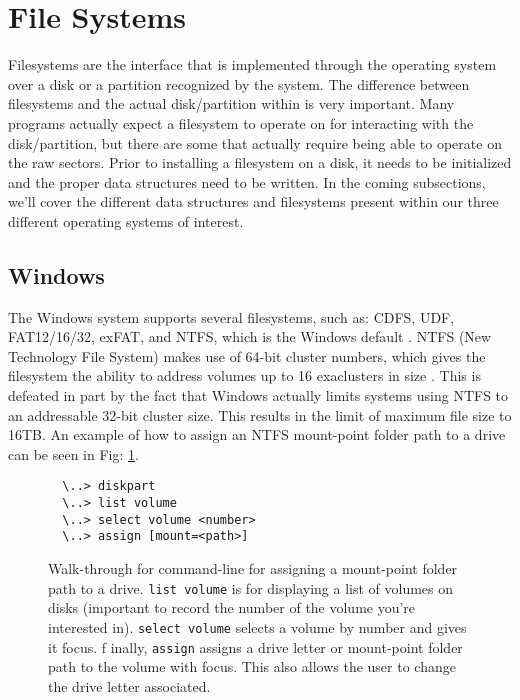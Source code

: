 \documentclass[10pt,draftclsnofoot,onecolumn]{IEEEtran}
\begin{document}
\section{File Systems}
\label{sec:File Systems}

\par Filesystems are the interface that is implemented through the operating system over a disk or a partition recognized by the system.
The difference between filesystems and the actual disk/partition within is very important.
Many programs actually expect a filesystem to operate on for interacting with the disk/partition, but there are some that actually require being able to operate on the raw sectors.
Prior to installing a filesystem on a disk, it needs to be initialized and the proper data structures need to be written.
In the coming subsections, we'll cover the different data structures and filesystems present within our three different operating systems of interest.

\subsection{Windows}
\label{sub:File Systems Windows}

\par The Windows system supports several filesystems, such as: CDFS, UDF, FAT12/16/32, exFAT, and NTFS, which is the Windows default \cite{win:2}.
NTFS (New Technology File System) makes use of 64-bit cluster numbers, which gives the filesystem the ability to address volumes up to 16 exaclusters in size \cite{win:2}.
This is defeated in part by the fact that Windows actually limits systems using NTFS to an addressable 32-bit cluster size.
This results in the limit of maximum file size to 16TB.
An example of how to assign an NTFS mount-point folder path to a drive can be seen in Fig: \ref{code:ntfs-mount}.

\begin{figure}[h]
\begin{lstlisting}
  \..> diskpart
  \..> list volume
  \..> select volume <number>
  \..> assign [mount=<path>]
\end{lstlisting}
\centering
\captionsetup{justification=centering}
\caption{
  Walk-through for command-line for assigning a mount-point folder path to a drive.
  \texttt{list volume} is for displaying a list of volumes on disks (important to record the number of the volume you're interested in).
  \texttt{select volume} selects a volume by number and gives it focus. f
  inally, \texttt{assign} assigns a drive letter or mount-point folder path to the volume with focus. This also allows the user to change the drive letter associated.
}
\label{code:ntfs-mount}
\end{figure}
\end{document}
